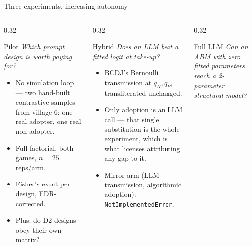 \documentclass[aspectratio=169,10pt]{beamer}
\newcommand{\hl}[1]{\textcolor{mLightBrown}{#1}}
\begin{document}
\begin{frame}{Three experiments, increasing autonomy}
  \begin{columns}[T,onlytextwidth]
    \begin{column}{0.32\textwidth}
      \begin{block}{Pilot}
        \scriptsize
        \emph{Which prompt design is worth paying for?}
        \begin{itemize}\scriptsize
          \item No simulation loop --- two hand-built contrastive samples from
                village 6: one real adopter, one real non-adopter.
          \item Full factorial, both games, $n=25$ reps/arm.
          \item Fisher's exact per design, FDR-corrected.
          \item Plus: do D2 designs \hl{obey their own matrix}?
        \end{itemize}
      \end{block}
    \end{column}
    \begin{column}{0.32\textwidth}
      \begin{block}{Hybrid}
        \scriptsize
        \emph{Does an LLM beat a fitted logit at take-up?}
        \begin{itemize}\scriptsize
          \item BCDJ's Bernoulli transmission at $q_N,q_P$, transliterated
                unchanged.
          \item \hl{Only adoption is an LLM call} --- that single substitution is
                the whole experiment, which is what licenses attributing any gap
                to it.
          \item Mirror arm (LLM transmission, algorithmic adoption):
                \texttt{NotImplementedError}.
        \end{itemize}
      \end{block}
    \end{column}
    \begin{column}{0.32\textwidth}
      \begin{block}{Full LLM}
        \scriptsize
        \emph{Can an ABM with zero fitted parameters reach a 2-parameter
        structural model?}
        \begin{itemize}\scriptsize

\end{itemize}
\end{block}
\end{column}
\end{columns}
\end{frame}
\end{document}
